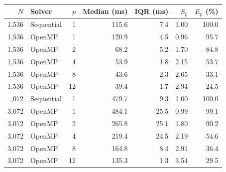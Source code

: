 \begin{tabular}{rlrrrrr}
\toprule
$N$ & Solver & $p$ & Median (ms) & IQR (ms) & $S_p$ & $E_p$ (\%) \\
\midrule
1,536 & Sequential & 1 & 115.6 & 7.4 & 1.00 & 100.0 \\
1,536 & OpenMP & 1 & 120.9 & 4.5 & 0.96 & 95.7 \\
1,536 & OpenMP & 2 & 68.2 & 5.2 & 1.70 & 84.8 \\
1,536 & OpenMP & 4 & 53.9 & 1.8 & 2.15 & 53.7 \\
1,536 & OpenMP & 8 & 43.6 & 2.3 & 2.65 & 33.1 \\
1,536 & OpenMP & 12 & 39.4 & 1.7 & 2.94 & 24.5 \\
\addlinespace
3,072 & Sequential & 1 & 479.7 & 9.3 & 1.00 & 100.0 \\
3,072 & OpenMP & 1 & 484.1 & 25.5 & 0.99 & 99.1 \\
3,072 & OpenMP & 2 & 265.8 & 25.1 & 1.80 & 90.2 \\
3,072 & OpenMP & 4 & 219.4 & 24.5 & 2.19 & 54.6 \\
3,072 & OpenMP & 8 & 164.8 & 8.4 & 2.91 & 36.4 \\
3,072 & OpenMP & 12 & 135.3 & 1.3 & 3.54 & 29.5 \\
\bottomrule
\end{tabular}
